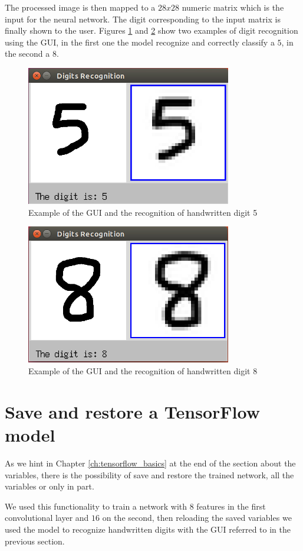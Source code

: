 The processed image is then mapped to a $28x28$ numeric matrix which is the input for the neural network. The digit corresponding to the input matrix is finally shown to the user. Figures \ref{fig:GUI_5} and \ref{fig:GUI_8} show two examples of digit recognition using the \acs{GUI}, in the first one the model recognize and correctly classify a $5$, in the second a $8$.

\begin{figure}
	\caption{Example of the GUI and the recognition of handwritten digit 5}
	\label{fig:GUI_5}
	\centering
	\includegraphics[width=0.8\textwidth]{Images/GUI_5}
\end{figure}

\begin{figure}
\caption{Example of the GUI and the recognition of handwritten digit 8}
\label{fig:GUI_8}
\centering
\includegraphics[width=0.8\textwidth]{Images/GUI_8}
\end{figure}

\section{Save and restore a TensorFlow model}

As we hint in Chapter \ref{ch:tensorflow_basics} at the end of the section about the variables, there is the possibility of save and restore the trained network, all the variables or only in part.

We used this functionality to train a network with $8$ features in the first convolutional layer and $16$ on the second, then reloading the saved variables we used the model to recognize handwritten digits with the GUI referred to in the previous section.
